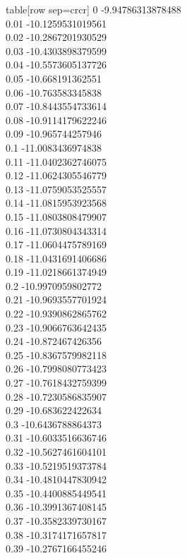   table[row sep=crcr]{%
0	-9.94786313878488\\
0.01	-10.1259531019561\\
0.02	-10.2867201930529\\
0.03	-10.4303898379599\\
0.04	-10.5573605137726\\
0.05	-10.668191362551\\
0.06	-10.763583345838\\
0.07	-10.8443554733614\\
0.08	-10.9114179622246\\
0.09	-10.965744257946\\
0.1	-11.0083436974838\\
0.11	-11.0402362746075\\
0.12	-11.0624305546779\\
0.13	-11.0759053525557\\
0.14	-11.0815953923568\\
0.15	-11.0803808479907\\
0.16	-11.0730804343314\\
0.17	-11.0604475789169\\
0.18	-11.0431691406686\\
0.19	-11.0218661374949\\
0.2	-10.9970959802772\\
0.21	-10.9693557701924\\
0.22	-10.9390862865762\\
0.23	-10.9066763642435\\
0.24	-10.872467426356\\
0.25	-10.8367579982118\\
0.26	-10.7998080773423\\
0.27	-10.7618432759399\\
0.28	-10.7230586835907\\
0.29	-10.683622422634\\
0.3	-10.6436788864373\\
0.31	-10.6033516636746\\
0.32	-10.5627461604101\\
0.33	-10.5219519373784\\
0.34	-10.4810447830942\\
0.35	-10.4400885449541\\
0.36	-10.3991367408145\\
0.37	-10.3582339730167\\
0.38	-10.3174171657817\\
0.39	-10.2767166455246\\
}
